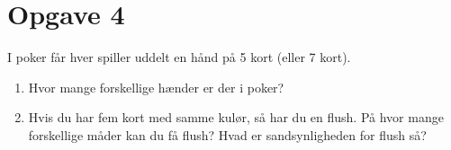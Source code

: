 \section*{Opgave 4}
I poker får hver spiller uddelt en hånd på 5 kort (eller 7 kort). 
\begin{enumerate}[label=\roman*)]
\item Hvor mange forskellige hænder er der i poker?
\item Hvis du har fem kort med samme kulør, så har du en flush. På hvor mange forskellige måder kan du få flush? Hvad er sandsynligheden for flush så?
\end{enumerate}